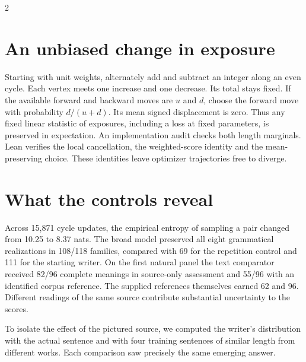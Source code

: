 \begin{multicols}{2}
\section*{An unbiased change in exposure}
Starting with unit weights, alternately add and subtract an integer along an even cycle. Each vertex meets one increase and one decrease. Its total stays fixed. If the available forward and backward moves are $u$ and $d$, choose the forward move with probability $d/(u+d)$. Its mean signed displacement is zero. Thus any fixed linear statistic of exposures, including a loss at fixed parameters, is preserved in expectation. An implementation audit checks both length marginals. Lean verifies the local cancellation, the weighted-score identity and the mean-preserving choice. These identities leave optimizer trajectories free to diverge.
\section*{What the controls reveal}
Across 15,871 cycle updates, the empirical entropy of sampling a pair changed from 10.25 to 8.37 nats. The broad model preserved all eight grammatical realizations in 108/118 families, compared with 69 for the repetition control and 111 for the starting writer. On the first natural panel the text comparator received 82/96 complete meanings in source-only assessment and 55/96 with an identified corpus reference. The supplied references themselves earned 62 and 96. Different readings of the same source contribute substantial uncertainty to the scores.
\end{multicols}
\newpage
{}
\noindent To isolate the effect of the pictured source, we computed the writer's distribution with the actual sentence and with four training sentences of similar length from different works. Each comparison saw precisely the same emerging answer.
